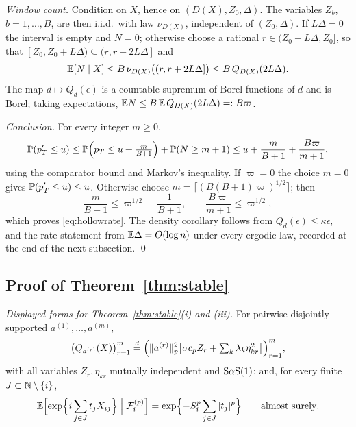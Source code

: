\emph{Window count.} Condition on $X$, hence on
$(D(X),Z_0,\Delta)$. The variables $Z_b$, $b=1,\dots,B$, are then
i.i.d.\ with law $\nu_{D(X)}$, independent of $(Z_0,\Delta)$. If $L\Delta=0$ the interval is empty and $N=0$; otherwise choose a
rational $r\in(Z_0-L\Delta,Z_0]$, so that
$[Z_0,Z_0+L\Delta)\subseteq(r,r+2L\Delta]$ and
\[
\mathbb{E}[N\mid X]
\le
B\,\nu_{D(X)}\bigl((r,r+2L\Delta]\bigr)
\le
B\,Q_{D(X)}(2L\Delta).
\]
The map $d\mapsto Q_d(\epsilon)$ is a countable supremum of Borel
functions of $d$ and is Borel; taking expectations,
$\mathbb{E} N\le B\,\mathbb{E}\,Q_{D(X)}(2L\Delta)=:B\varpi$.

\emph{Conclusion.} For every integer $m\ge0$,
\[
\mathbb{P}(p_T'\le u)
\le
\mathbb{P}\Bigl(p_T\le u+\tfrac{m}{B+1}\Bigr)
+\mathbb{P}(N\ge m+1)
\le
u+\frac{m}{B+1}+\frac{B\varpi}{m+1},
\]
using the comparator bound and Markov's inequality. If $\varpi=0$ the
choice $m=0$ gives $\mathbb{P}(p_T'\le u)\le u$. Otherwise choose
$m=\lceil(B(B+1)\varpi)^{1/2}\rceil$; then
\[
\frac{m}{B+1}\le \varpi^{1/2}+\frac1{B+1},
\qquad
\frac{B\varpi}{m+1}\le \varpi^{1/2},
\]
which proves \eqref{eq:hollowrate}. The density corollary follows
from $Q_d(\epsilon)\le\kappa\epsilon$, and the rate statement from
$\mathbb{E}\Delta=O(\log n)$ under every ergodic law, recorded at the end of
the next subsection. \qed

\subsection{Proof of Theorem~\ref{thm:stable}}

\emph{Displayed forms for Theorem~\ref{thm:stable}(i) and (iii).}
For pairwise disjointly supported $a^{(1)},\dots,a^{(m)}$,
\begin{equation}
\label{eq:stable-joint-qf}
\bigl(Q_{a^{(r)}}(X)\bigr)_{r=1}^m
\overset{d}{=}
\Bigl(\lVert a^{(r)}\rVert_p^2
\bigl[\sigma c_pZ_r+\textstyle\sum_k\lambda_k\eta_{kr}^2\bigr]\Bigr)_{r=1}^m,
\end{equation}
with all variables $Z_r,\eta_{kr}$ mutually independent and
$\mathrm{S}\alpha\mathrm{S}(1)$; and, for every finite $J\subset\mathbb{N}\setminus\{i\}$,
\begin{equation}
\label{eq:conditional-row-cf}
\mathbb{E}\Bigl[\exp\Bigl\{i\sum_{j\in J}t_jX_{ij}\Bigr\}\Bigm|\mathcal F^{(p)}_i\Bigr]
=\exp\Bigl\{-S_i^p\sum_{j\in J}|t_j|^p\Bigr\}
\qquad\text{almost surely}.
\end{equation}

